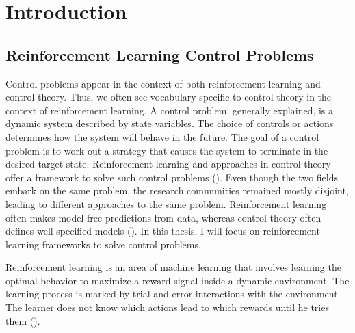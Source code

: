 
\chapter{Introduction}
\label{ch:introduction}


\section{Reinforcement Learning Control Problems}
Control problems appear in the context of both reinforcement learning and control theory. Thus, we often see vocabulary specific to control theory in the context of reinforcement learning. A control problem, generally explained, is a dynamic system described by state variables. The choice of controls or actions determines how the system will behave in the future. The goal of a control problem is to work out a strategy that causes the system to terminate in the desired target state. Reinforcement learning and approaches in control theory offer a framework to solve such control problems (\cite{bucsoniu2018reinforcement}). Even though the two fields embark on the same problem, the research communities remained mostly disjoint, leading to different approaches to the same problem. Reinforcement learning often makes model-free predictions from data, whereas control theory often defines well-specified models (\cite{recht2018tour}). In this thesis, I will focus on reinforcement learning frameworks to solve control problems.

Reinforcement learning is an area of machine learning that involves learning the optimal behavior to maximize a reward signal inside a dynamic environment. The learning process is marked by trial-and-error interactions with the environment. The learner does not know which actions lead to which rewards until he tries them (\cite{kaelbling1996reinforcement}).

